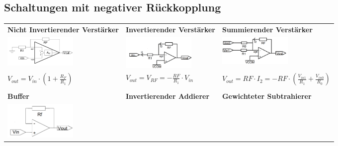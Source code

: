 \documentclass[margin=normal]{tex/hsrzf}
\begin{document}
\subsection{Schaltungen mit negativer Rückkopplung}
\begingroup
\small
\begin{tabularx}{0.8\textwidth}{p{155pt}p{155pt}p{155pt}}
  \textbf{Nicht Invertierender Verstärker}                                                          &
  \textbf{Invertierender Verstärker}                                                                &
  \textbf{Summierender Verstärker}                                                                    \\
  \includegraphics[width = 3.5cm]{img/OpAmp/Verstaerker_nicht_invertierend.png}                     &
  \includegraphics[width = 3.5cm]{img/OpAmp/Verstaerker_invertierend.png}                           &
  \includegraphics[width = 3.5cm]{img/OpAmp/Verstaerker_summierend.png}                               \\
  $ V_{out} = V_{in} \cdot (1 + \frac{R_F}{R_1})$                                                   &
  $ V_{out} = V_{RF} = -\frac{RF}{R_1}\cdot V_{in}$                                                 &
  $ V_{out} = RF \cdot I_2 = -RF \cdot (\frac{V_{in1}}{R_1} + \frac{V_{in0}}{R_0}) $                  \\
  \\
  \textbf{Buffer}                                                                                   &
  \textbf{Invertierender Addierer}                                                                  &
  \textbf{Gewichteter Subtrahierer}                                                                   \\
  \includegraphics[width = 3.5cm]{img/OpAmp/Buffer.png}                                             &

\end{tabularx}
\end{document}

